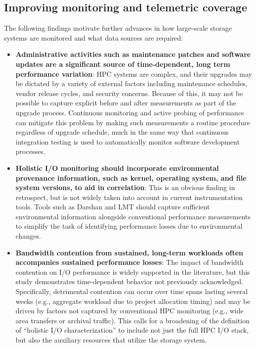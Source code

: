 \subsection{Improving monitoring and telemetric coverage}

The following findings motivate further advances in how large-scale storage systems are monitored and what data sources are required:


\begin{itemize}[leftmargin=*]

\item \textbf{Administrative activities such as maintenance patches and
software updates are a significant source of time-dependent, long term
performance variation}: HPC systems are complex, and their upgrades may be
dictated by a variety of external factors including maintenance schedules,
vendor release cycles, and security concerns.  Because of this, it may not be
possible to capture explicit before and after measurements as part of the
upgrade process.  Continuous monitoring and active probing of performance
can mitigate this problem by making such measurements a routine procedure regardless of upgrade
schedule, much in the same way that continuous integration testing is used
to automatically monitor software development processes.

\item \textbf{Holistic I/O monitoring should incorporate environmental
provenance information, such as kernel, operating system, and file system
versions, to aid in correlation}: 
This is an obvious finding in retrospect, but is not widely taken into
account in current instrumentation tools.  Tools such as Darshan and
LMT should capture sufficient environmental information 
alongside conventional performance measurements to
simplify the task of identifying performance losses due to environmental changes.

\item \textbf{Bandwidth contention from sustained, long-term workloads often accompanies
sustained performance losses}: The impact of bandwidth contention on I/O
performance is widely supported in the literature, but this study demonstrates
time-dependent behavior not previously acknowledged. Specifically, detrimental contention
can occur over time spans lasting several weeks (e.g., aggregate
workload due to project allocation timing) and may be driven by factors 
not captured by conventional HPC monitoring (e.g., wide area transfers or 
archival traffic).  This calls for a broadening of the definition of
``holistic I/O characterization'' to include not just the full HPC I/O
stack, but also the auxiliary resources that utilize the storage system.

\end{itemize}


